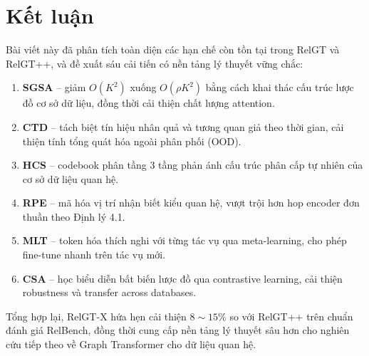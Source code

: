 \documentclass[12pt,a4paper]{article}
\begin{document}
\section{Kết luận}

Bài viết này đã phân tích toàn diện các hạn chế còn tồn tại trong RelGT và
RelGT++, và đề xuất sáu cải tiến có nền tảng lý thuyết vững chắc:

\begin{enumerate}
  \item \textbf{SGSA} -- giảm $O(K^2)$ xuống $O(\rho K^2)$ bằng cách khai thác
        cấu trúc lược đồ cơ sở dữ liệu, đồng thời cải thiện chất lượng attention.
  \item \textbf{CTD} -- tách biệt tín hiệu nhân quả và tương quan giả theo thời
        gian, cải thiện tính tổng quát hóa ngoài phân phối (OOD).
  \item \textbf{HCS} -- codebook phân tầng 3 tầng phản ánh cấu trúc phân cấp
        tự nhiên của cơ sở dữ liệu quan hệ.
  \item \textbf{RPE} -- mã hóa vị trí nhận biết kiểu quan hệ, vượt trội hơn
        hop encoder đơn thuần theo Định lý 4.1.
  \item \textbf{MLT} -- token hóa thích nghi với từng tác vụ qua meta-learning,
        cho phép fine-tune nhanh trên tác vụ mới.
  \item \textbf{CSA} -- học biểu diễn bất biến lược đồ qua contrastive learning,
        cải thiện robustness và transfer across databases.
\end{enumerate}

Tổng hợp lại, RelGT-X hứa hẹn cải thiện $8\sim15\%$ so với RelGT++ trên
chuẩn đánh giá RelBench, đồng thời cung cấp nền tảng lý thuyết sâu hơn
cho nghiên cứu tiếp theo về Graph Transformer cho dữ liệu quan hệ.
\end{document}
